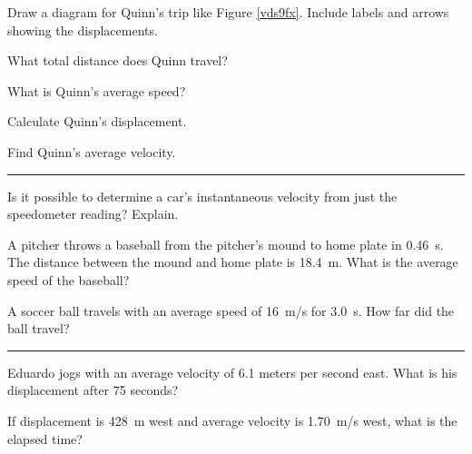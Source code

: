 \documentclass{article}
\begin{document}
\begin{exercise} \label{qquil7}
    Draw a diagram for Quinn's trip like Figure \ref{vds9fx}. Include labels and arrows showing the displacements.
\end{exercise}

\begin{exercise} \label{c7YaTG}
    What total distance does Quinn travel?
\end{exercise}

\begin{exercise} \label{ASXgWQ}
    What is Quinn's average speed?
\end{exercise}

\begin{exercise} \label{iG7rDo}
    Calculate Quinn's displacement.
\end{exercise}

\begin{exercise} \label{cIfbMu}
    Find Quinn's average velocity.
\end{exercise}

\hrule

\begin{exercise} \label{JYqHaE}
    Is it possible to determine a car's instantaneous velocity from just the speedometer reading? Explain.
\end{exercise}

\begin{exercise} \label{EeYgx7}
A pitcher throws a baseball from the pitcher's mound to home plate in \SI{0.46}{s}. The distance between the mound and home plate is \SI{18.4}{m}. What is the average speed of the baseball?
\end{exercise}

\begin{exercise} \label{Zj7dfC}
    A soccer ball travels with an average speed of \SI{16}{m/s} for \SI{3.0}{s}. How far did the ball travel?
\end{exercise}

\hrule

\vspace{1em}

\begin{exercise} \label{ix2lKL}
Eduardo jogs with an average velocity of 6.1 meters per second east. What is his displacement after 75 seconds?
\end{exercise}


\begin{exercise} \label{BI1eOB}
If displacement is \SI{428}{m} west and average velocity is \SI{1.70}{m/s} west, what is the elapsed time?
\end{exercise}
\end{document}
